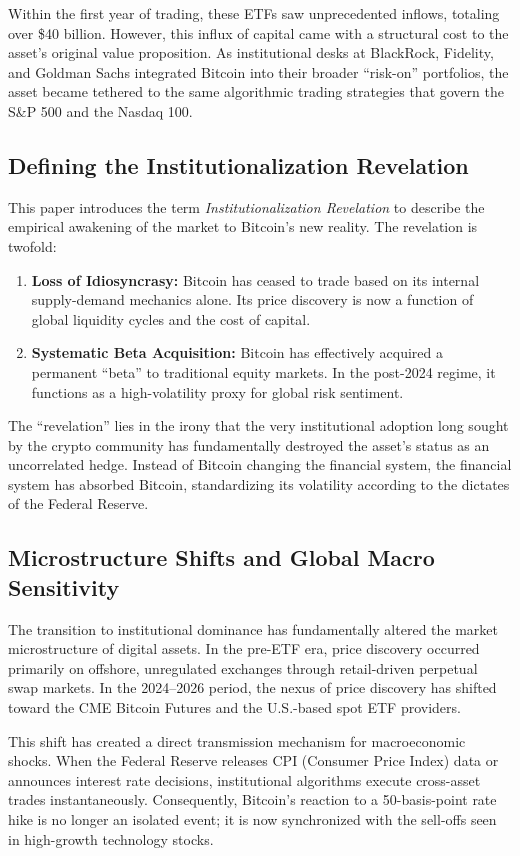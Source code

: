 \documentclass[10pt, conference, compsocconf]{IEEEtran}
\begin{document}
Within the first year of trading, these ETFs saw unprecedented inflows, totaling over \$40 billion. However, this influx of capital came with a structural cost to the asset's original value proposition. As institutional desks at BlackRock, Fidelity, and Goldman Sachs integrated Bitcoin into their broader ``risk-on'' portfolios, the asset became tethered to the same algorithmic trading strategies that govern the S\&P 500 and the Nasdaq 100.

\subsection{Defining the Institutionalization Revelation}
This paper introduces the term \textit{Institutionalization Revelation} to describe the empirical awakening of the market to Bitcoin’s new reality. The revelation is twofold:
\begin{enumerate}
    \item \textbf{Loss of Idiosyncrasy:} Bitcoin has ceased to trade based on its internal supply-demand mechanics alone. Its price discovery is now a function of global liquidity cycles and the cost of capital.
    \item \textbf{Systematic Beta Acquisition:} Bitcoin has effectively acquired a permanent ``beta'' to traditional equity markets. In the post-2024 regime, it functions as a high-volatility proxy for global risk sentiment.
\end{enumerate}

The ``revelation'' lies in the irony that the very institutional adoption long sought by the crypto community has fundamentally destroyed the asset’s status as an uncorrelated hedge. Instead of Bitcoin changing the financial system, the financial system has absorbed Bitcoin, standardizing its volatility according to the dictates of the Federal Reserve.

\subsection{Microstructure Shifts and Global Macro Sensitivity}
The transition to institutional dominance has fundamentally altered the market microstructure of digital assets. In the pre-ETF era, price discovery occurred primarily on offshore, unregulated exchanges through retail-driven perpetual swap markets. In the 2024--2026 period, the nexus of price discovery has shifted toward the CME Bitcoin Futures and the U.S.-based spot ETF providers.

This shift has created a direct transmission mechanism for macroeconomic shocks. When the Federal Reserve releases CPI (Consumer Price Index) data or announces interest rate decisions, institutional algorithms execute cross-asset trades instantaneously. Consequently, Bitcoin’s reaction to a 50-basis-point rate hike is no longer an isolated event; it is now synchronized with the sell-offs seen in high-growth technology stocks.
\end{document}
